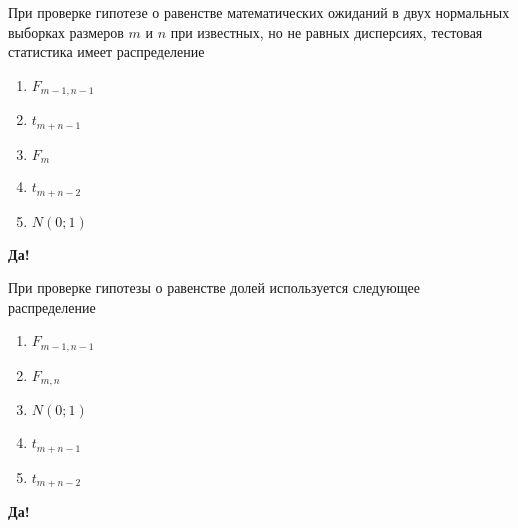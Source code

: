 \documentclass[t]{beamer}
\begin{document}
 \begin{frame} \label{5-Yes} 
\begin{block}{5} 

  При проверке гипотезе о равенстве математических ожиданий в двух нормальных выборках размеров $m$ и $n$ при известных, но не равных дисперсиях, тестовая статистика имеет распределение
  


 \end{block} 
\begin{enumerate} 
\item[] \hyperlink{5-No}{\beamergotobutton{} $F_{m-1,n-1}$}
\item[] \hyperlink{5-No}{\beamergotobutton{} $t_{m+n-1}$}
\item[] \hyperlink{5-No}{\beamergotobutton{} $F_m$}
\item[] \hyperlink{5-No}{\beamergotobutton{} $t_{m+n-2}$}
\item[] \hyperlink{5-Yes}{\beamergotobutton{} $N(0;1)$}
\end{enumerate} 

 \textbf{Да!} 
 \hyperlink{6}{}\end{frame} 


 \begin{frame} \label{6-Yes} 
\begin{block}{6} 

  При проверке гипотезы о равенстве долей используется следующее распределение
  


 \end{block} 
\begin{enumerate} 
\item[] \hyperlink{6-No}{\beamergotobutton{} $F_{m-1,n-1}$}
\item[] \hyperlink{6-No}{\beamergotobutton{} $F_{m, n}$}
\item[] \hyperlink{6-Yes}{\beamergotobutton{} $N(0;1)$}
\item[] \hyperlink{6-No}{\beamergotobutton{} $t_{m+n-1}$}
\item[] \hyperlink{6-No}{\beamergotobutton{} $t_{m+n-2}$}
\end{enumerate} 

 \textbf{Да!} 
 \hyperlink{7}{}\end{frame} 
\end{document}
